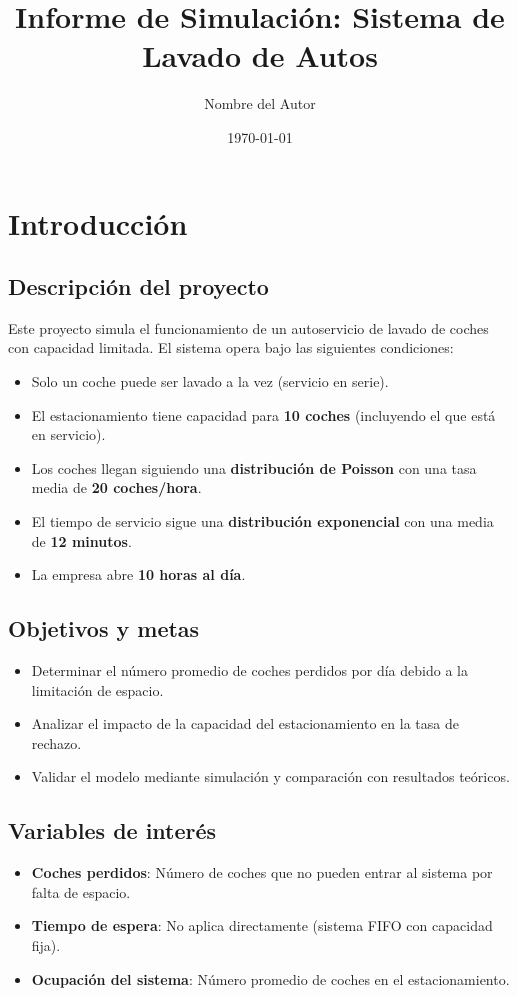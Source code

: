 \documentclass{article}
\title{Informe de Simulación: Sistema de Lavado de Autos}
\author{Nombre del Autor}
\date{\today}
\begin{document}
\maketitle

\section{Introducción}

\subsection{Descripción del proyecto}
Este proyecto simula el funcionamiento de un autoservicio de lavado de coches con capacidad limitada. El sistema opera bajo las siguientes condiciones:
\begin{itemize}
    \item Solo un coche puede ser lavado a la vez (servicio en serie).
    \item El estacionamiento tiene capacidad para \textbf{10 coches} (incluyendo el que está en servicio).
    \item Los coches llegan siguiendo una \textbf{distribución de Poisson} con una tasa media de \textbf{20 coches/hora}.
    \item El tiempo de servicio sigue una \textbf{distribución exponencial} con una media de \textbf{12 minutos}.
    \item La empresa abre \textbf{10 horas al día}.
\end{itemize}

\subsection{Objetivos y metas}
\begin{itemize}
    \item Determinar el número promedio de coches perdidos por día debido a la limitación de espacio.
    \item Analizar el impacto de la capacidad del estacionamiento en la tasa de rechazo.
    \item Validar el modelo mediante simulación y comparación con resultados teóricos.
\end{itemize}

\subsection{Variables de interés}
\begin{itemize}
    \item \textbf{Coches perdidos}: Número de coches que no pueden entrar al sistema por falta de espacio.
    \item \textbf{Tiempo de espera}: No aplica directamente (sistema FIFO con capacidad fija).
    \item \textbf{Ocupación del sistema}: Número promedio de coches en el estacionamiento.
\end{itemize}
\end{document}
